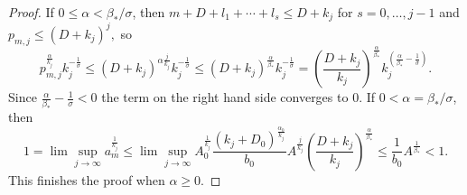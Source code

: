 \documentclass[10pt,a4paper]{amsart}
\begin{document}
\begin{proof}
	If $
	0\leq\alpha
	<
	\beta_{\ast}/\sigma$, then  $m+D+l_{1}+\cdots+l_{s}\leq D+k_{j}$ for
	$s=0, \dots ,j-1$ and $p_{m,j}\leq\left(  D+k_{j}\right)  ^{j},$ so
	\[
	p_{m,j}^{\frac{\alpha}{k_{j}}}k_{j}^{-\frac{1}{\sigma}}
	\leq
	\left(  D+k_{j}\right)
	^{\alpha\frac{j}{k_{j}}}k_{j}^{-\frac{1}{\sigma}}\leq\left(  D+k_{j}\right)
	^{\frac{\alpha}{\beta_{\ast}}}k_{j}^{-\frac{1}{\sigma}}=\left(  \frac{D+k_{j}
	}{k_{j}}\right)  ^{\frac{\alpha}{\beta_{\ast}}}k_{j}^{\left(  \frac{\alpha
		}{\beta_{\ast}}-\frac{1}{\sigma}\right)  }.
	\]
	Since $\frac{\alpha}{\beta_{\ast}}-\frac{1}{\sigma}<0$ the term on the right
	hand side converges to $0$. If  $
	0 <\alpha
	=
	\beta_{\ast}/\sigma$, then
	\[
	1=\lim\sup_{j\rightarrow\infty}a_{m}^{\frac{1}{k_{j}}}
	\leq
	\lim\sup
	_{j\rightarrow\infty}A_{0}^{\frac{1}{k_{j}}}\frac{\left(  k_{j}+D_{0}\right)
		^{\frac{\alpha_{0}}{k_{j}}}}{b_{0}}A^{\frac{j}{k_{j}}}\left(  \frac{D+k_{j}
	}{k_{j}}\right)  ^{\frac{\alpha}{\beta_{\ast}}}\leq\frac{1}{b_{0}}A^{\frac
		{1}{\beta_{\ast}}} < 1.
	\] 
	This finishes the proof when $\alpha\geq0.$
	

\end{proof}
\end{document}

